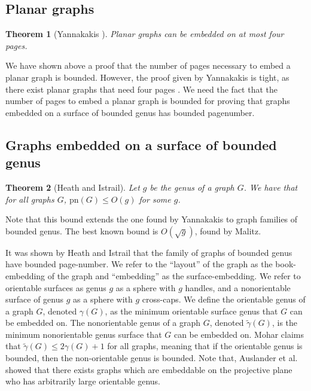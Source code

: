 \documentclass[]{report}
\newcommand{\pn}{\text{pn}}
\newtheorem{theorem}{Theorem}
\theoremstyle{definition}
\numberwithin{theorem}{section}
\numberwithin{equation}{section}
\begin{document}
\subsection{Planar graphs}\label{ssec:Planar_Graphs}
\begin{theorem}[Yannakakis \cite{yannakakisEmbeddingPlanarGraphs1989}] \label{thm:4Pages_Planar}
	Planar graphs can be embedded on at most four pages.
\end{theorem}
We have shown above a proof that the number of pages necessary to embed a planar graph is bounded. However, the proof given by Yannakakis is tight, as there exist planar graphs that need four pages \cite{yannakakisPlanarGraphsThat2020} \cite{kaufmannFourPagesAre2020}. We need the fact that the number of pages to embed a planar graph is bounded for proving that graphs embedded on a surface of bounded genus has bounded pagenumber. 

\subsection{Graphs embedded on a surface of bounded genus}\label{ssec:pagenumber_bounded_genus}
\begin{theorem}[Heath and Istrail\cite{heathPagenumberGenusGraphs1992}]\label{thm:Genus_pagenumber_bound}
	Let $g$ be the genus of a graph $G$. We have that for all graphs $G$, $\pn(G) \leq O(g)$ for some $g$.
\end{theorem}
Note that this bound extends the one found by Yannakakis \cite{yannakakisEmbeddingPlanarGraphs1989} to graph families of bounded genus. 
The best known bound is $O(\sqrt{g})$, found by Malitz\cite{malitzGenusGraphsHave1994}.

It was shown by Heath and Istrail that the family of graphs of bounded genus have bounded page-number. 
We refer to the ``layout'' of the graph as the book-embedding of the graph and ``embedding'' as the surface-embedding. We refer to orientable surfaces as genus $g$ as a sphere with $g$ handles, and a nonorientable surface of genus $g$ as a sphere with $g$ cross-caps. We define the orientable genus of a graph $G$, denoted $\gamma(G)$, as the minimum orientable surface genus that $G$ can be embedded on. The nonorientable genus of a graph $G$, denoted $\tilde{\gamma}(G)$, is the minimum nonorientable genus surface that $G$ can be embedded on. Mohar\cite{moharOrientableGenusGraphs1998} claims that $\tilde{\gamma}(G) \leq 2 \gamma(G) + 1$ for all graphs, meaning that if the orientable genus is bounded, then the non-orientable genus is bounded. Note that, Auslander et al.\cite{auslanderImbeddingGraphsManifolds1963} showed that there exists graphs which are embeddable on the projective plane who has arbitrarily large orientable genus. 
\end{document}

